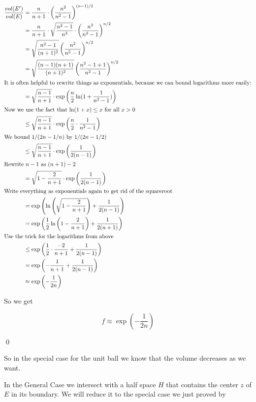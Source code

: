 \begin{pr}
\begin{align*}\frac{vol(E')}{vol(E)}&=\frac{n}{n+1}\cdot \left(\frac{n^2}{n^2-1}\right)^{(n-1)/2}\\
&= \frac{n}{n+1}\cdot \sqrt{\frac{n^2-1}{n^2}} \cdot \left(\frac{n^2}{n^2-1}\right)^{n/2}\\
&=\sqrt{\frac{n^2-1}{(n+1)^2}} \left(\frac{n^2}{n^2-1}\right)^{n/2}\\
&=\sqrt{\frac{(n-1)(n+1)}{(n+1)^2}} \left(\frac{n^2-1+1}{n^2-1}\right)^{n/2}\\
\intertext{It is often helpful to rewrite things as exponentials, because we can bound logarithms more easily:}
&= \sqrt{\frac{n-1}{n+1}} \cdot \exp\left(\frac{n}{2} \ln (1+\frac{1}{n^2-1})\right)\\
\intertext{Now we use the fact that $\ln (1+x)\leq x$ for all $x>0$}
&\leq \sqrt{\frac{n-1}{n+1}} \cdot \exp\left(\frac{n}{2} \cdot \frac{1}{n^2-1}\right)\\
\intertext{We bound $1/(2n-1/n)$ by $1/(2n-1/2)$}
&\leq \sqrt{\frac{n-1}{n+1}} \cdot \exp\left(\frac{1}{2(n-1)}\right)\\
\intertext{Rewrite $n-1$ as $(n+1)-2$}
&=\sqrt{1-\frac{2}{n+1}}\cdot \exp\left(\frac{1}{2(n-1)}\right)\\
\intertext{Write everything as exponentials again to get rid of the squareroot}
&= \exp \left(\ln\left(\sqrt{1-\frac{2}{n+1}}\right)+\frac{1}{2(n-1)}\right)\\
&=\exp \left(\frac{1}{2}\ln \left(1-\frac{2}{n+1}\right) +\frac{1}{2(n+1)}\right)\\
\intertext{Use the trick for the logarithms from above}
&\leq \exp \left(\frac{1}{2} \cdot \frac{-2}{n+1} + \frac{1}{2(n-1)}\right)\\
&= \exp \left(-\frac{1}{n+1}+\frac{1}{2(n-1)}\right)\\
&\approx \exp \left(-\frac{1}{2n}\right)
\end{align*}

So we get

\[f \approx \exp \left(-\frac{1}{2n}\right)\]

\qed \end{pr}

So in the special case for the unit ball we know that the volume decreases as we want.

In the General Case we intersect with a half space $H$ that contains the center $z$ of $E$ in its boundary. We will reduce it to the special case we just proved by

